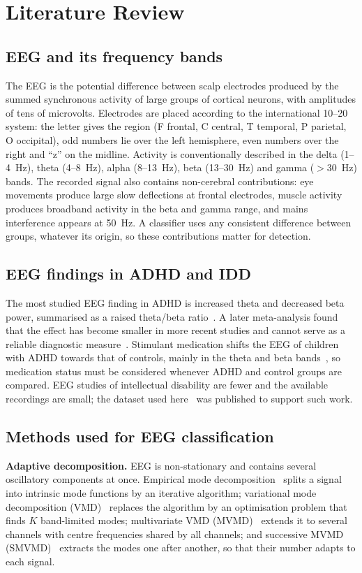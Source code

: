 \chapter{Literature Review}
\thispagestyle{empty}

\section{EEG and its frequency bands}
The EEG is the potential difference between scalp electrodes produced by the summed synchronous
activity of large groups of cortical neurons, with amplitudes of tens of microvolts. Electrodes
are placed according to the international 10--20 system: the letter gives the region (F frontal,
C central, T temporal, P parietal, O occipital), odd numbers lie over the left hemisphere, even
numbers over the right and ``z'' on the midline. Activity is conventionally described in the
delta (1--4~Hz), theta (4--8~Hz), alpha (8--13~Hz), beta (13--30~Hz) and gamma ($>$30~Hz) bands.
The recorded signal also contains non-cerebral contributions: eye movements produce large slow
deflections at frontal electrodes, muscle activity produces broadband activity in the beta and
gamma range, and mains interference appears at 50~Hz. A classifier uses any consistent
difference between groups, whatever its origin, so these contributions matter for detection.

\section{EEG findings in ADHD and IDD}
The most studied EEG finding in ADHD is increased theta and decreased beta power, summarised as
a raised theta/beta ratio~\cite{snyder2006}. A later meta-analysis found that the effect has
become smaller in more recent studies and cannot serve as a reliable diagnostic
measure~\cite{arns2013}. Stimulant medication shifts the EEG of children with ADHD towards that
of controls, mainly in the theta and beta bands~\cite{clarke2002}, so medication status must be
considered whenever ADHD and control groups are compared. EEG studies of intellectual disability
are fewer and the available recordings are small; the dataset used here~\cite{sareen2020data} was
published to support such work.

\section{Methods used for EEG classification}
\textbf{Adaptive decomposition.} EEG is non-stationary and contains several oscillatory
components at once. Empirical mode decomposition~\cite{huang1998} splits a signal into intrinsic
mode functions by an iterative algorithm; variational mode decomposition (VMD)~\cite{dragomiretskiy2014}
replaces the algorithm by an optimisation problem that finds $K$ band-limited modes; multivariate
VMD (MVMD)~\cite{rehman2019} extends it to several channels with centre frequencies shared by all
channels; and successive MVMD (SMVMD)~\cite{liu2022} extracts the modes one after another, so
that their number adapts to each signal.

